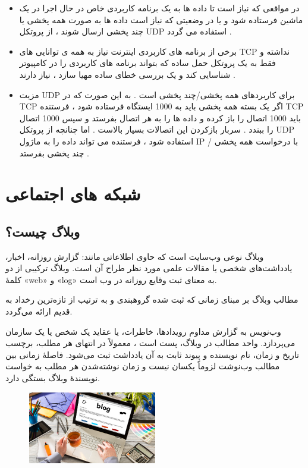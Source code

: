 \documentclass[12pt]{book}
\begin{document}
\begin{itemize}
	\item در مواقعی که نیاز است تا داده ها به یک برنامه کاربردی خاص در حال اجرا در یک ماشین فرستاده شود و یا در وضعیتی که نیاز است داده ها به صورت همه پخشی یا چند پخشی ارسال شوند ، از پروتکل UDP 
	استفاده می گردد .
	\item برخی از برنامه های کاربردی اینترنت نیاز به همه ی توانایی های TCP
	نداشته و فقط به یک پروتکل حمل ساده که بتواند برنامه های کاربردی را در کامپیوتر شناسایی کند و یک بررسی خطای ساده مهیا سازد ، نیاز دارند .
	\item مزیت UDP
	برای کاربردهای همه پخشی/چند پخشی است . به این صورت که در TCP
	اگر یک بسته همه پخشی باید به 1000 ایستگاه فرستاده شود ، فرستنده TCP باید 1000 اتصال را باز کرده و داده ها را به هر اتصال بفرستد و سپس 1000 اتصال را ببندد .
	سربار بازکردن این اتصالات بسیار بالاست .
	اما چنانچه از پروتکل UDP استفاده شود ، فرستنده می تواند داده را به ماژول IP با درخواست همه پخشی / چند پخشی بفرستد .
\end{itemize}





\newpage


\chapter{شبکه های اجتماعی}


\section{وبلاگ چیست؟}

وبلاگ نوعی وب‌سایت است که حاوی اطلاعاتی مانند: گزارش روزانه، اخبار، یادداشت‌های شخصی یا مقالات علمی مورد نظر طراح آن است. وبلاگ ترکیبی از دو کلمهٔ «web» و «log» به معنای ثبت وقایع روزانه در وب است.

مطالب وبلاگ بر مبنای زمانی که ثبت شده گروهبندی و به ترتیب از تازه‌ترین رخداد به قدیم ارائه می‌گردد.

وب‌نویس به گزارش مداوم رویدادها، خاطرات، یا عقاید یک شخص یا یک سازمان می‌پردازد. واحد مطالب در وبلاگ، پست است ،
معمولاً در انتهای هر مطلب، برچسب تاریخ و زمان، نام نویسنده و پیوند ثابت به آن یادداشت ثبت می‌شود. فاصلهٔ زمانی بین مطالب وب‌نوشت لزوماً یکسان نیست و زمان نوشته‌شدن هر مطلب به خواست نویسندهٔ وبلاگ بستگی دارد. 


\begin{figure}[!h]
\begin{center}
\includegraphics[width=0.5\textwidth]{./Project_blog.jpg}
\caption{}
\label{fig:figure2}
\end{center}
\end{figure}
\end{document}
